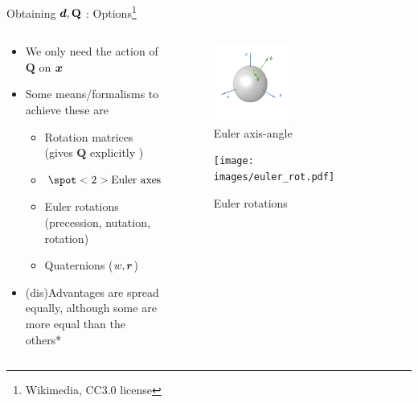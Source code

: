\documentclass[notes]{beamer}
\newcommand{\gv}[1]{\ensuremath{\mbox{\boldmath$ #1 $}}}
\newcommand{\bv}[1]{\ensuremath{\mathbf{#1}}}
\begin{document}
\begin{frame}[label={sec:org8baeed9}]{Obtaining \(\gv{d}, \bv{Q}\) : Options\footnote{Wikimedia, CC3.0 license}}
\begin{columns}
\begin{column}{0.6\columnwidth}
\begin{itemize}
\item We only need the \alert{action} of \(\bv{Q}\) on \(\gv{x}\)
\item Some means/formalisms to achieve these are
\begin{itemize}
\item Rotation matrices (gives \(\bv{Q}\) explicitly )
\item \(\spot<2>{\text{Euler axes and angle } \gv{r} = \theta \hat{\gv{e}} }\)
\item Euler rotations (precession, nutation, rotation)
\item Quaternions (\(w, \gv{r}\))
\end{itemize}
\item (dis)Advantages are spread equally, although some are more equal than the others*
\end{itemize}
\end{column}
\begin{column}{0.4\columnwidth}
\begin{figure}[htbp]
\centering
\includegraphics[width=0.45\textwidth]{images/euler_aa.png}
\caption{Euler axis-angle}
\end{figure}
\begin{figure}[htbp]
\centering
\texttt{[image: images/euler\_rot.pdf]}
\caption{Euler rotations}
\end{figure}
\end{column}
\end{columns}
\end{frame}
\end{document}
